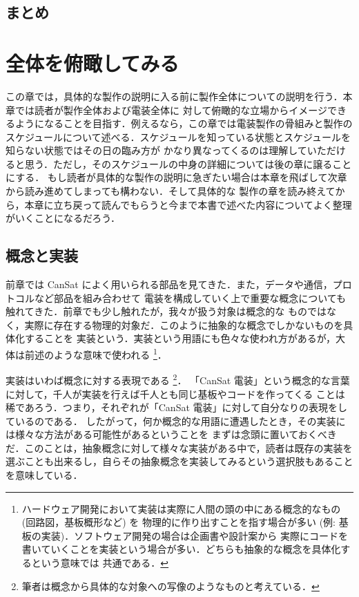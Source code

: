 \documentclass[dvipdfmx]{jsbook}
\begin{document}
\section{まとめ}

\clearpage

\chapter{全体を俯瞰してみる}

この章では，具体的な製作の説明に入る前に製作全体についての説明を行う．本章では読者が製作全体および電装全体に
対して俯瞰的な立場からイメージできるようになることを目指す．例えるなら，この章では電装製作の骨組みと製作の
スケジュールについて述べる．スケジュールを知っている状態とスケジュールを知らない状態ではその日の臨み方が
かなり異なってくるのは理解していただけると思う．ただし，そのスケジュールの中身の詳細については後の章に譲ることにする．
もし読者が具体的な製作の説明に急ぎたい場合は本章を飛ばして次章から読み進めてしまっても構わない．そして具体的な
製作の章を読み終えてから，本章に立ち戻って読んでもらうと今まで本書で述べた内容についてよく整理がいくことになるだろう．

\section{概念と実装}
\label{sec:概念と実装}

  前章では CanSat によく用いられる部品を見てきた．また，データや通信，プロトコルなど部品を組み合わせて
  電装を構成していく上で重要な概念についても触れてきた．前章でも少し触れたが，我々が扱う対象は概念的な
  ものではなく，実際に存在する物理的対象だ．このように抽象的な概念でしかないものを具体化することを
  実装という．実装という用語にも色々な使われ方があるが，大体は前述のような意味で使われる
  \footnote{ハードウェア開発において実装は実際に人間の頭の中にある概念的なもの (回路図，基板概形など) を
  物理的に作り出すことを指す場合が多い (例: 基板の実装)．ソフトウェア開発の場合は企画書や設計案から
  実際にコードを書いていくことを実装という場合が多い．どちらも抽象的な概念を具体化するという意味では
  共通である．}．

  実装はいわば概念に対する表現である
  \footnote{筆者は概念から具体的な対象への写像のようなものと考えている．}．
  「CanSat 電装」という概念的な言葉に対して，千人が実装を行えば千人とも同じ基板やコードを作ってくる
  ことは稀であろう．つまり，それぞれが「CanSat 電装」に対して自分なりの表現をしているのである．
  したがって，何か概念的な用語に遭遇したとき，その実装には様々な方法がある可能性があるということを
  まずは念頭に置いておくべきだ．このことは，抽象概念に対して様々な実装がある中で，読者は既存の実装を
  選ぶことも出来るし，自らその抽象概念を実装してみるという選択肢もあることを意味している．
\end{document}
